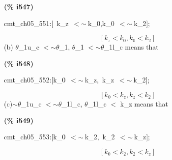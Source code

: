 \documentclass[fleqn]{article}
\begin{document}
\noindent
\begin{minipage}[t]{4.000000em}\color{red}\bfseries
(\% i547)	
\end{minipage}
\begin{minipage}[t]{\textwidth}\color{blue}
cmt\_ch05\_551:[\ k\_z\ \ensuremath{<}\ensuremath{\sim\ }k\_0,k\_0\ \ensuremath{<}\ensuremath{\sim\ }k\_2];
\end{minipage}
\[\displaystyle \tag{\% o547} 
\left[ {k_z}\operatorname{<  }{k_0}\operatorname{,}{k_0}\operatorname{<  }{k_2}\right] \mbox{}
\]
(b) \ensuremath{\theta}\_1u\_c \ensuremath{<}\ensuremath{\sim }\ensuremath{\theta}\_1, \ensuremath{\theta}\_1 \ensuremath{<}\ensuremath{\sim }\ensuremath{\theta}\_1l\_c means that


\noindent
\begin{minipage}[t]{4.000000em}\color{red}\bfseries
(\% i548)	
\end{minipage}
\begin{minipage}[t]{\textwidth}\color{blue}
cmt\_ch05\_552:[k\_0\ \ensuremath{<}\ensuremath{\sim\ }k\_z,\ k\_z\ \ensuremath{<}\ensuremath{\sim\ }k\_2];
\end{minipage}
\[\displaystyle \tag{\% o548} 
\left[ {k_0}\operatorname{<  }{k_z}\operatorname{,}{k_z}\operatorname{<  }{k_2}\right] \mbox{}
\]
(c)\ensuremath{\sim }\ensuremath{\theta}\_1u\_c \ensuremath{<}\ensuremath{\sim }\ensuremath{\theta}\_1l\_c, \ensuremath{\theta}\_1l\_c \ensuremath{<} k\_z means that


\noindent
\begin{minipage}[t]{4.000000em}\color{red}\bfseries
(\% i549)	
\end{minipage}
\begin{minipage}[t]{\textwidth}\color{blue}
cmt\_ch05\_553:[k\_0\ \ensuremath{<}\ensuremath{\sim\ }k\_2,\ k\_2\ \ensuremath{<}\ensuremath{\sim\ }k\_z];
\end{minipage}
\[\displaystyle \tag{\% o549} 
\left[ {k_0}\operatorname{<  }{k_2}\operatorname{,}{k_2}\operatorname{<  }{k_z}\right] \mbox{}
\]
\end{document}
